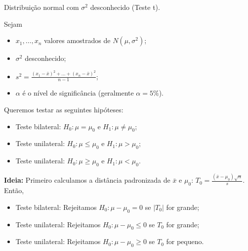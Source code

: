 \documentclass[8pt]{beamer}
\begin{document}
\begin{frame}{Distribuição normal com $\sigma^2$ desconhecido (Teste t).}

\normalsize

Sejam
\begin{itemize}
	\item $x_1, \dots, x_n$ valores amostrados de $N(\mu, \sigma^2)$;
	\item $\sigma^2$ desconhecido;
	\item $s^2 = \frac{(x_1 - \bar{x})^2 + \dots + (x_n - \bar{x})^2}{n-1}$;
	\item $\alpha$ é o nível de significância (geralmente $\alpha=5\%$). 
\end{itemize}
\vfill

Queremos testar as seguintes hipóteses:
\begin{itemize}
	\item Teste bilateral: $H_0: \mu= \mu_0$ e $H_1: \mu \neq \mu_0$;
	\item Teste unilateral: $H_0: \mu \leq \mu_0$ e $H_1: \mu > \mu_0$;
	\item Teste unilateral: $H_0: \mu \geq \mu_0$ e $H_1: \mu < \mu_0$.
\end{itemize}
\vfill

\textbf{Ideia:} Primeiro calculamos a distância padronizada de $\bar{x}$ e $\mu_0$: $T_0 = \frac{(\bar{x} - \mu_0) \sqrt{n}}{s}$. Então, 
\begin{itemize}
	\item Teste bilateral: Rejeitamos $H_0: \mu - \mu_0 =0$ se $\lvert T_0 \rvert$ for grande;
	\item Teste unilateral: Rejeitamos $H_0: \mu - \mu_0 \leq 0$ se $T_0 $ for grande;
	\item Teste unilateral: Rejeitamos $H_0: \mu - \mu_0 \geq 0$ se $T_0 $ for pequeno.
\end{itemize}


\normalsize
\end{frame}
\end{document}
